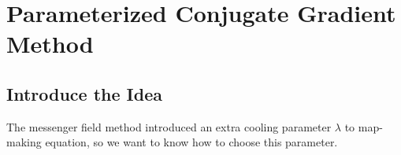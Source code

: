 \documentclass[twocolumn,linenumbers]{aastex631}
\newcommand{\vbd}{\vb{d}}
\newcommand{\vbm}{\vb{m}}
\newcommand{\vbb}{\vb{b}}
\newcommand{\inv}[1]{#1^{-1}}
\newcommand{\hatm}{\vb{\hat{m}}}
\newcommand{\Pdagger}{P^{\dagger}}
\newcommand{\PPinv}[1]{\inv{\qty(\Pdagger #1 P)}}
\begin{document}


%
%

\section{Parameterized Conjugate Gradient Method}

\subsection{Introduce the Idea}
The messenger field method introduced an extra cooling parameter $\lambda$ to
map-making equation, so we want to know how to choose this parameter.
\end{document}
